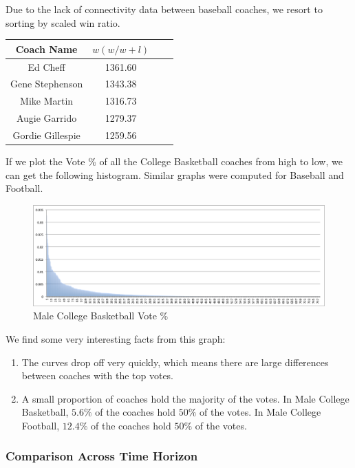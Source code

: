 \documentclass[titlepage,11pt]{article}
\begin{document}
Due to the lack of connectivity data between baseball coaches, we resort to sorting by scaled win ratio.
\begin{center}
\begin{tabular}{ | c | c | c| c | }
\hline
Coach Name       & $w (w / w + l)$ \\\hline
Ed Cheff         & 1361.60 \\\hline
Gene Stephenson  & 1343.38 \\\hline
Mike Martin      & 1316.73 \\\hline
Augie Garrido    & 1279.37 \\\hline
Gordie Gillespie & 1259.56 \\
\hline
\end{tabular}
\end{center}

\noindent If we plot the Vote \% of all the College Basketball coaches from high to low, we can get the following histogram. Similar graphs were computed for Baseball and Football.

\begin{figure}[H]
      \caption{Male College Basketball Vote \%}
      \centering
      \includegraphics[width=1\textwidth]{graphs/basketball_score_dist.png}
 \end{figure}

\noindent We find some very interesting facts from this graph:

\begin{enumerate}
\item The curves drop off very quickly, which means there are large differences between coaches with the top votes.
\item A small proportion of coaches hold the majority of the votes. In Male College Basketball, $5.6\%$ of the coaches hold $50\%$ of the votes. In Male College Football, $12.4\%$ of the coaches hold $50\%$ of the votes.
\end{enumerate}

\subsubsection*{Comparison Across Time Horizon}
\end{document}
